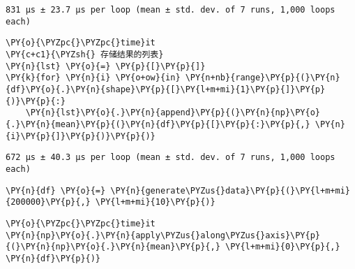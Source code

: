     \begin{Verbatim}[commandchars=\\\{\}]
831 µs ± 23.7 µs per loop (mean ± std. dev. of 7 runs, 1,000 loops each)
    \end{Verbatim}

    \begin{tcolorbox}[breakable, size=fbox, boxrule=1pt, pad at break*=1mm,colback=cellbackground, colframe=cellborder]
\begin{Verbatim}[commandchars=\\\{\}]
\PY{o}{\PYZpc{}\PYZpc{}time}it
\PY{c+c1}{\PYZsh{} 存储结果的列表}
\PY{n}{lst} \PY{o}{=} \PY{p}{[}\PY{p}{]}
\PY{k}{for} \PY{n}{i} \PY{o+ow}{in} \PY{n+nb}{range}\PY{p}{(}\PY{n}{df}\PY{o}{.}\PY{n}{shape}\PY{p}{[}\PY{l+m+mi}{1}\PY{p}{]}\PY{p}{)}\PY{p}{:}
    \PY{n}{lst}\PY{o}{.}\PY{n}{append}\PY{p}{(}\PY{n}{np}\PY{o}{.}\PY{n}{mean}\PY{p}{(}\PY{n}{df}\PY{p}{[}\PY{p}{:}\PY{p}{,} \PY{n}{i}\PY{p}{]}\PY{p}{)}\PY{p}{)}
\end{Verbatim}
\end{tcolorbox}

    \begin{Verbatim}[commandchars=\\\{\}]
672 µs ± 40.3 µs per loop (mean ± std. dev. of 7 runs, 1,000 loops each)
    \end{Verbatim}

    \begin{tcolorbox}[breakable, size=fbox, boxrule=1pt, pad at break*=1mm,colback=cellbackground, colframe=cellborder]
\begin{Verbatim}[commandchars=\\\{\}]
\PY{n}{df} \PY{o}{=} \PY{n}{generate\PYZus{}data}\PY{p}{(}\PY{l+m+mi}{200000}\PY{p}{,} \PY{l+m+mi}{10}\PY{p}{)}
\end{Verbatim}
\end{tcolorbox}

    \begin{tcolorbox}[breakable, size=fbox, boxrule=1pt, pad at break*=1mm,colback=cellbackground, colframe=cellborder]
\begin{Verbatim}[commandchars=\\\{\}]
\PY{o}{\PYZpc{}\PYZpc{}time}it
\PY{n}{np}\PY{o}{.}\PY{n}{apply\PYZus{}along\PYZus{}axis}\PY{p}{(}\PY{n}{np}\PY{o}{.}\PY{n}{mean}\PY{p}{,} \PY{l+m+mi}{0}\PY{p}{,} \PY{n}{df}\PY{p}{)}
\end{Verbatim}
\end{tcolorbox}

